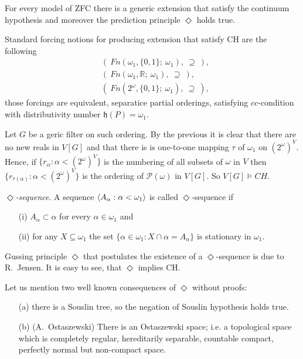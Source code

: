 For every model of ZFC there is a generic extension that satisfy the continuum hypothesis
and moreover the prediction principle $\Diamond$ holds true.

Standard forcing notions for producing extension that satisfy CH are the following
\begin{eqnarray*}
& (\ Fn(\omega_1, \{0,1\};\ \omega_1), \ \supseteq \ ), \\
& (\ Fn(\omega_1, \mathbb R;\ \omega_1), \ \supseteq \ ), \\
& (\ Fn(2^\omega, \{0,1\};\ \omega_1), \ \supseteq \ ),
\end{eqnarray*}
those forcings are equivalent, separatice partial orderings, satisfying $cc$-condition
with distributivity number $\mathfrak h(P) = \omega_1$.

\smallskip

Let $G$ be a geric filter on such ordering. By the previous it is clear that there are
no new reals in $V[G]$ and that there is is one-to-one mapping $\tau$ of $\omega_1$
on $(2^\omega)^V$. Hence, if $\{r_\alpha : \alpha < (2^\omega)^V \}$ is the numbering
of all subsets of $\omega$ in $V$ then  $\{r_{\tau(\alpha)} : \alpha < (2^\omega)^V \}$
is the ordering of $\mathcal P(\omega)$ in $V[G]$. So $V[G] \vDash CH$.

\begin{definition}
 \emph{$\Diamond$-sequence}. A sequence $\langle A_\alpha   : \alpha < \omega_1 \rangle$ is called
$\Diamond$-sequence if
\begin{itemize}
 \item[(i)] $A_\alpha \subset \alpha$ for every $\alpha \in \omega_1$ and
 \item[(ii)] for any $X \subseteq \omega_1$ the set
$\{ \alpha \in \omega_1 :  X \cap \alpha = A_\alpha \}$ is stationary in $\omega_1$.
\end{itemize}
\end{definition}

Gussing principle $\Diamond$ that postulates the existence of a $\Diamond$-sequence
is due to R.~Jensen. It is easy to see, that $\Diamond$ implies CH.

\smallskip

Let us mention two well known consequences of $\Diamond$ without proofs:
\begin{itemize}
 \item[(a)] there is a Souslin tree, so the negation of Souslin hypothesis holds true.
 \item[(b)] (A.~Ostaszewski) There is an Ostaszewski space; i.e. a topological space
which is completely regular, hereditarily separable, countable compact, perfectly normal
 but non-compact space.
\end{itemize}


